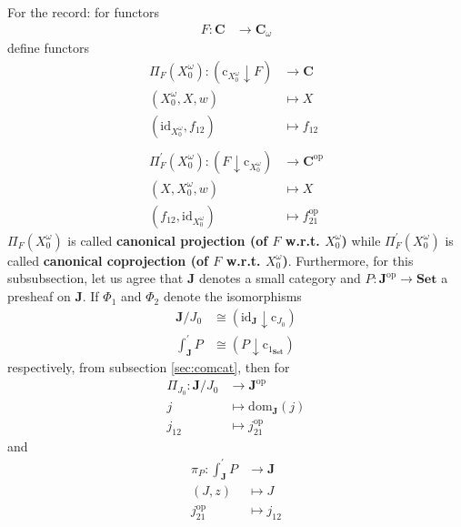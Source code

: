 For the record: for functors
\begin{align*}
  F
  \colon
  \mathbf{C}
  &\rightarrow
  \mathbf{C}_{\omega}
\end{align*}
define functors
\begin{align*}
  \Pi_{F}(X_{0}^{\omega})
  \colon
  \left(
    \mathrm{c}_{X_{0}^{\omega}}
    \downarrow
    F
  \right)
  &\rightarrow
  \mathbf{C}
  \\
  (X_{0}^{\omega},X,w)
  &\mapsto
  X
  \\
  \left(
    \mathrm{id}_{X_{0}^{\omega}},
    f_{12}
  \right)
  &\mapsto
  f_{12}
  \\\\
  \Pi_{F}^{\prime}(X_{0}^{\omega})
  \colon
  \left(
    F
    \downarrow
    \mathrm{c}_{X_{0}^{\omega}}
  \right)
  &\rightarrow
  \mathbf{C}^{\textrm{op}}
  \\
  (X,X_{0}^{\omega},w)
  &\mapsto
  X
  \\
  \left(
    f_{12},
    \mathrm{id}_{X_{0}^{\omega}}
  \right)
  &\mapsto
  f_{21}^{\textrm{op}}
\end{align*}
$\Pi_{F}(X_{0}^{\omega})$ is called \textbf{canonical projection (of $F$ w.r.t. $X_{0}^{\omega}$)} while $\Pi_{F}^{\prime}(X_{0}^{\omega})$ is called \textbf{canonical coprojection (of $F$ w.r.t. $X_{0}^{\omega}$)}.
Furthermore, for this subsubsection, let us agree that $\mathbf{J}$ denotes a small category and $P \colon \mathbf{J}^{\textrm{op}} \rightarrow \mathbf{Set}$ a presheaf on $\mathbf{J}$.
If $\Phi_{1}$ and $\Phi_{2}$ denote the isomorphisms
\begin{align*}
  \mathbf{J}
  \slash
  J_{0}
  &\cong
  \left(
    \mathrm{id}_{\mathbf{J}}
    \downarrow
    \mathrm{c}_{J_{0}}
  \right)
  \\
  \int_{\mathbf{J}}^{\prime}
  P
  &\cong
  \left(
    P
    \downarrow
    \mathrm{c}_{1_{\mathbf{Set}}}
  \right)
\end{align*}
respectively, from subsection \ref{sec:comcat}, then for
\begin{align*}
  \Pi_{J_{0}}
  \colon
  \mathbf{J}
  \slash
  J_{0}
  &\rightarrow
  \mathbf{J}^{\textrm{op}}
  \\
  j
  &\mapsto
  \mathrm{dom}_{\mathbf{J}}(j)
  \\
  j_{12}
  &\mapsto
  j_{21}^{\textrm{op}}
\end{align*}
and
\begin{align*}
  \pi_{P}
  \colon
  \int_{\mathbf{J}}^{\prime}
  P
  &\rightarrow
  \mathbf{J}
  \\
  (J,z)
  &\mapsto
  J
  \\
  j_{21}^{\textrm{op}}
  &\mapsto
  j_{12}
\end{align*}
